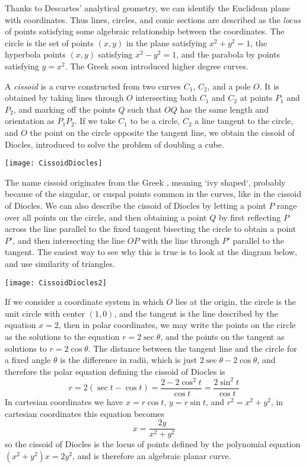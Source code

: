 Thanks to Descartes' analytical geometry, we can identify the Euclidean plane with coordinates. Thus lines, circles, and conic sections are described as the {\it locus} of points satisfying some algebraic relationship between the coordinates. The circle is the set of points $(x,y)$ in the plane satisfying $x^2 + y^2 = 1$, the hyperbola points $(x,y)$ satisfying $x^2 - y^2 = 1$, and the parabola by points satisfying $y = x^2$. The Greek soon introduced higher degree curves.

\begin{example}
    A \emph{cissoid} is a curve constructed from two curves $C_1$, $C_2$, and a pole $O$. It is obtained by taking lines through $O$ intersecting both $C_1$ and $C_2$ at points $P_1$ and $P_2$, and marking off the points $Q$ such that $OQ$ has the same length and orientation as $P_1P_2$. If we take $C_1$ to be a circle, $C_2$ a line tangent to the circle, and $O$ the point on the circle opposite the tangent line, we obtain the cissoid of Diocles, introduced to solve the problem of doubling a cube.
    \begin{center}
    \texttt{[image: CissoidDiocles]}
    \end{center}
    The name cissoid originates from the Greek \textkappa \textiota \textsigma \textsigma \textomikron \textepsilon \textiota \textdelta \texteta \textvarsigma, meaning `ivy shaped`, probably because of the singular, or cuspal points common in the curves, like in the cissoid of Diocles. We can also describe the cissoid of Diocles by letting a point $P$ range over all points on the circle, and then obtaining a point $Q$ by first reflecting $P$ across the line parallel to the fixed tangent bisecting the circle to obtain a point $P'$, and then intersecting the line $OP$ with the line through $P'$ parallel to the tangent. The easiest way to see why this is true is to look at the diagram below, and use similarity of triangles.
    \begin{center}
        \texttt{[image: CissoidDiocles2]}
    \end{center}
    If we consider a coordinate system in which $O$ lies at the origin, the circle is the unit circle with center $(1,0)$, and the tangent is the line described by the equation $x = 2$, then in polar coordinates, we may write the points on the circle as the solutions to the equation $r = 2 \sec \theta$, and the points on the tangent as solutions to $r = 2 \cos \theta$. The distance between the tangent line and the circle for a fixed angle $\theta$ is the difference in radii, which is just $2 \sec \theta - 2 \cos \theta$, and therefore the polar equation defining the cissoid of Diocles is
    \[ r = 2(\sec t - \cos t) = \frac{2 - 2\cos^2 t}{\cos t} = \frac{2 \sin^2 t}{\cos t}\]
    In cartesian coordinates we have $x = r \cos t$, $y = r \sin t$, and $r^2 = x^2 + y^2$, in cartesian coordinates this equation becomes
    \[ x = \frac{2y}{x^2 + y^2} \]
    so the cissoid of Diocles is the locus of points defined by the polynomial equation $(x^2 + y^2) x = 2y^2$, and is therefore an algebraic planar curve.
\end{example}

